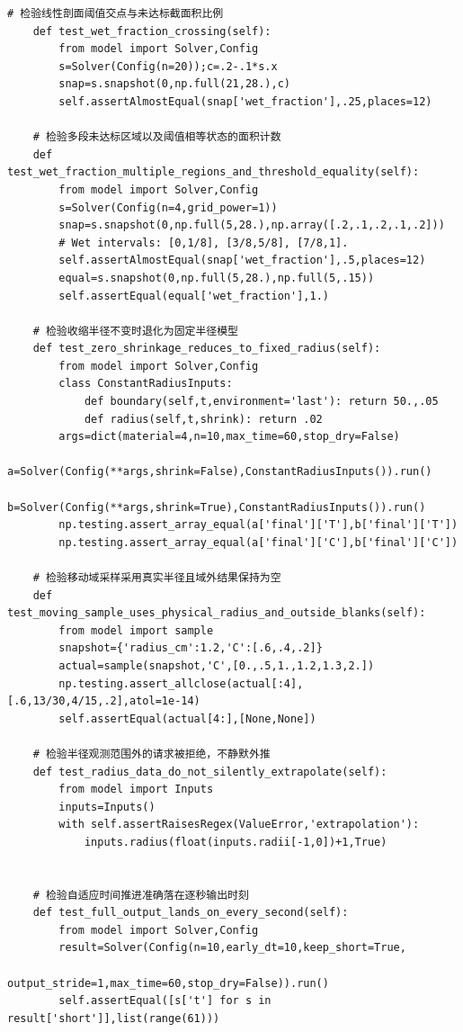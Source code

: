 \begin{Verbatim}[fontsize=\scriptsize,breaklines=true,breakanywhere=true]
    # 检验线性剖面阈值交点与未达标截面积比例
    def test_wet_fraction_crossing(self):
        from model import Solver,Config
        s=Solver(Config(n=20));c=.2-.1*s.x
        snap=s.snapshot(0,np.full(21,28.),c)
        self.assertAlmostEqual(snap['wet_fraction'],.25,places=12)

    # 检验多段未达标区域以及阈值相等状态的面积计数
    def test_wet_fraction_multiple_regions_and_threshold_equality(self):
        from model import Solver,Config
        s=Solver(Config(n=4,grid_power=1))
        snap=s.snapshot(0,np.full(5,28.),np.array([.2,.1,.2,.1,.2]))
        # Wet intervals: [0,1/8], [3/8,5/8], [7/8,1].
        self.assertAlmostEqual(snap['wet_fraction'],.5,places=12)
        equal=s.snapshot(0,np.full(5,28.),np.full(5,.15))
        self.assertEqual(equal['wet_fraction'],1.)

    # 检验收缩半径不变时退化为固定半径模型
    def test_zero_shrinkage_reduces_to_fixed_radius(self):
        from model import Solver,Config
        class ConstantRadiusInputs:
            def boundary(self,t,environment='last'): return 50.,.05
            def radius(self,t,shrink): return .02
        args=dict(material=4,n=10,max_time=60,stop_dry=False)
        a=Solver(Config(**args,shrink=False),ConstantRadiusInputs()).run()
        b=Solver(Config(**args,shrink=True),ConstantRadiusInputs()).run()
        np.testing.assert_array_equal(a['final']['T'],b['final']['T'])
        np.testing.assert_array_equal(a['final']['C'],b['final']['C'])

    # 检验移动域采样采用真实半径且域外结果保持为空
    def test_moving_sample_uses_physical_radius_and_outside_blanks(self):
        from model import sample
        snapshot={'radius_cm':1.2,'C':[.6,.4,.2]}
        actual=sample(snapshot,'C',[0.,.5,1.,1.2,1.3,2.])
        np.testing.assert_allclose(actual[:4],[.6,13/30,4/15,.2],atol=1e-14)
        self.assertEqual(actual[4:],[None,None])

    # 检验半径观测范围外的请求被拒绝，不静默外推
    def test_radius_data_do_not_silently_extrapolate(self):
        from model import Inputs
        inputs=Inputs()
        with self.assertRaisesRegex(ValueError,'extrapolation'):
            inputs.radius(float(inputs.radii[-1,0])+1,True)


    # 检验自适应时间推进准确落在逐秒输出时刻
    def test_full_output_lands_on_every_second(self):
        from model import Solver,Config
        result=Solver(Config(n=10,early_dt=10,keep_short=True,
                             output_stride=1,max_time=60,stop_dry=False)).run()
        self.assertEqual([s['t'] for s in result['short']],list(range(61)))


\end{Verbatim}
